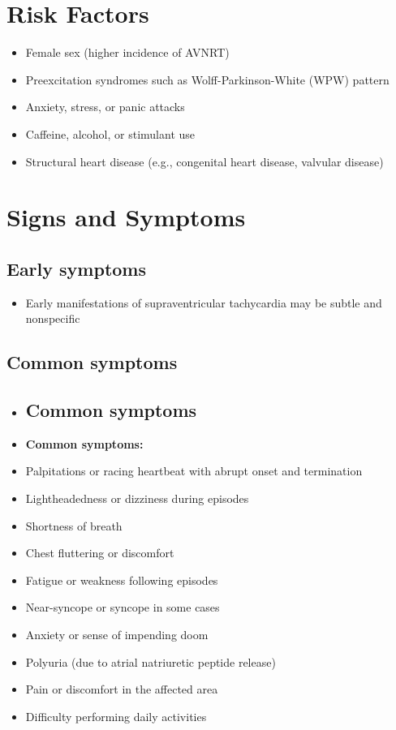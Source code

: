 \section{Risk Factors}

\begin{itemize}[noitemsep]
  \item Female sex (higher incidence of AVNRT)
  \item Preexcitation syndromes such as Wolff-Parkinson-White (WPW) pattern
  \item Anxiety, stress, or panic attacks
  \item Caffeine, alcohol, or stimulant use
  \item Structural heart disease (e.g., congenital heart disease, valvular disease)
\end{itemize}

\section{Signs and Symptoms}

\subsection{Early symptoms}
\begin{itemize}[noitemsep]
  \item Early manifestations of supraventricular tachycardia may be subtle and nonspecific
\end{itemize}

\subsection{Common symptoms}
\begin{itemize}[noitemsep]
  \item \subsection{Common symptoms}
  \item \textbf{Common symptoms:}
  \item Palpitations or racing heartbeat with abrupt onset and termination
  \item Lightheadedness or dizziness during episodes
  \item Shortness of breath
  \item Chest fluttering or discomfort
  \item Fatigue or weakness following episodes
  \item Near-syncope or syncope in some cases
  \item Anxiety or sense of impending doom
  \item Polyuria (due to atrial natriuretic peptide release)
  \item Pain or discomfort in the affected area
  \item Difficulty performing daily activities
\end{itemize}

